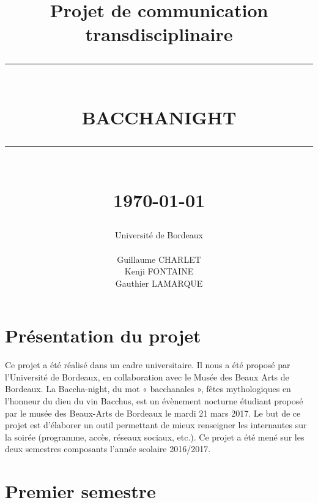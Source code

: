 \documentclass[11pt]{report}
\newcommand{\HRule}[1]{\rule{\linewidth}{#1}}
\renewcommand{\thesection}{\arabic{section}}
\begin{document}
\title
{
	\Large{Projet de communication transdisciplinaire}
	\HRule{2pt} \\ [0.5cm]
	\LARGE \textbf{\uppercase{Bacchanight}}
	\HRule{2pt} \\ [0.5cm]
	\normalsize \today
}

\date{}

\author
{
	\LARGE{Université de Bordeaux} \\
	\\
	Guillaume CHARLET \\
    Kenji FONTAINE \\
    Gauthier LAMARQUE \\
}

\maketitle


\tableofcontents


\renewcommand{\thesection}{\arabic{section}}

\section{Présentation du projet}

Ce projet a été réalisé dans un cadre universitaire. Il nous a été proposé par
l'Université de Bordeaux, en collaboration avec le Musée des Beaux Arts de Bordeaux.
La Baccha-night, du mot « bacchanales », fêtes mythologiques en l’honneur du
dieu du vin Bacchus, est un évènement nocturne étudiant proposé par le musée
des Beaux-Arts de Bordeaux le mardi 21 mars 2017.
Le but de ce projet est d'élaborer un outil permettant de mieux renseigner
les internautes sur la soirée (programme, accès, réseaux sociaux, etc.).
Ce projet a été mené sur les deux semestres composants l'année scolaire 2016/2017.

\section{Premier semestre}
\end{document}
